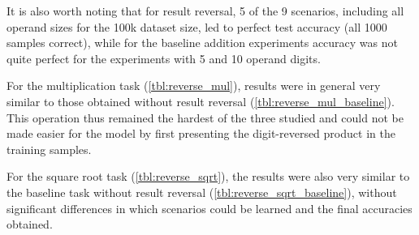 It is also worth noting that for result reversal, 5 of the 9 scenarios, including all operand sizes for the 100k dataset size, led to perfect test accuracy (all 1000 samples correct), while for the baseline addition experiments accuracy was not quite perfect for the experiments with 5 and 10 operand digits.

\begin{table}[H]
	\begin{minipage}[t]{0.47\linewidth}
		\hfill
		\label{tbl:reverse_mul}
	\end{minipage}
	\hfill %
	\begin{minipage}[t]{0.47\linewidth}
		\hfill
		\label{tbl:reverse_mul_baseline}
	\end{minipage}
\end{table}

For the multiplication task (\cref{tbl:reverse_mul}), results were in general very similar to those obtained without result reversal (\cref{tbl:reverse_mul_baseline}). This operation thus remained the hardest of the three studied and could not be made easier for the model by first presenting the digit-reversed product in the training samples.

\begin{table}[H]
	\begin{minipage}[t]{0.47\linewidth}
		\hfill
		\label{tbl:reverse_sqrt}
	\end{minipage}
	\hfill %
	\begin{minipage}[t]{0.47\linewidth}
		\hfill
		\label{tbl:reverse_sqrt_baseline}
	\end{minipage}
\end{table}

For the square root task (\cref{tbl:reverse_sqrt}), the results were also very similar to the baseline task without result reversal (\cref{tbl:reverse_sqrt_baseline}), without significant differences in which scenarios could be learned and  the final accuracies obtained.


